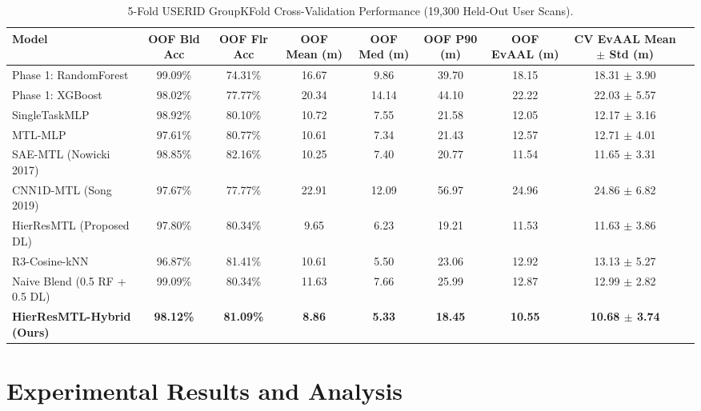 \documentclass[conference]{IEEEtran}
\begin{document}
\begin{table}[t]
\caption{5-Fold USERID GroupKFold Cross-Validation Performance (19,300 Held-Out User Scans).}
\label{tab:cv_results}
\centering
\small
\begin{tabular}{lcccccccc}
\toprule
Model & OOF Bld Acc & OOF Flr Acc & OOF Mean (m) & OOF Med (m) & OOF P90 (m) & OOF EvAAL (m) & CV EvAAL Mean $\pm$ Std (m) \\
\midrule
Phase 1: RandomForest & 99.09\% & 74.31\% & 16.67 & 9.86 & 39.70 & 18.15 & 18.31 $\pm$ 3.90 \\
Phase 1: XGBoost & 98.02\% & 77.77\% & 20.34 & 14.14 & 44.10 & 22.22 & 22.03 $\pm$ 5.57 \\
SingleTaskMLP & 98.92\% & 80.10\% & 10.72 & 7.55 & 21.58 & 12.05 & 12.17 $\pm$ 3.16 \\
MTL-MLP & 97.61\% & 80.77\% & 10.61 & 7.34 & 21.43 & 12.57 & 12.71 $\pm$ 4.01 \\
SAE-MTL (Nowicki 2017) & 98.85\% & 82.16\% & 10.25 & 7.40 & 20.77 & 11.54 & 11.65 $\pm$ 3.31 \\
CNN1D-MTL (Song 2019) & 97.67\% & 77.77\% & 22.91 & 12.09 & 56.97 & 24.96 & 24.86 $\pm$ 6.82 \\
HierResMTL (Proposed DL) & 97.80\% & 80.34\% & 9.65 & 6.23 & 19.21 & 11.53 & 11.63 $\pm$ 3.86 \\
R3-Cosine-kNN & 96.87\% & 81.41\% & 10.61 & 5.50 & 23.06 & 12.92 & 13.13 $\pm$ 5.27 \\
Naive Blend (0.5 RF + 0.5 DL) & 99.09\% & 80.34\% & 11.63 & 7.66 & 25.99 & 12.87 & 12.99 $\pm$ 2.82 \\
\textbf{HierResMTL-Hybrid (Ours)} & \textbf{98.12\%} & \textbf{81.09\%} & \textbf{8.86} & \textbf{5.33} & \textbf{18.45} & \textbf{10.55} & \textbf{10.68 $\pm$ 3.74} \\
\bottomrule
\end{tabular}
\end{table}

\section{Experimental Results and Analysis}
\end{document}
